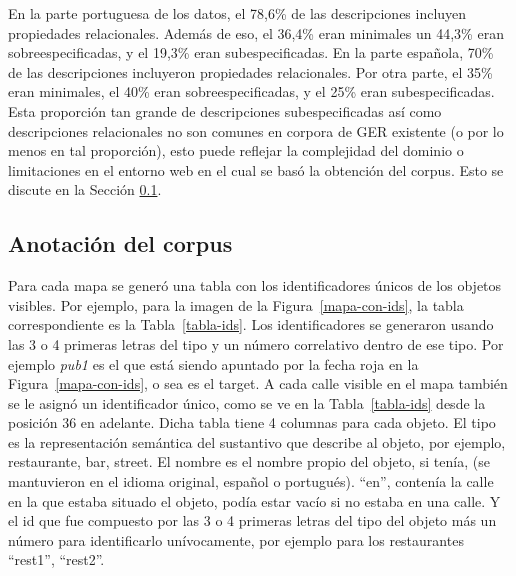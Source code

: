 En la parte portuguesa de los datos, el 78,6\% de las descripciones incluyen propiedades relacionales. Adem\'as de eso, el 36,4\% eran minimales un 44,3\% eran sobreespecificadas, y el 19,3\% eran subespecificadas. En la parte espa\~nola, 70\% de las descripciones incluyeron propiedades relacionales. Por otra parte, el 35\% eran minimales, el 40\% eran sobreespecificadas, y el 25\% eran subespecificadas.
Esta proporci\'on tan grande de descripciones subespecificadas as\'{i} como descripciones relacionales no son comunes en corpora de GER existente (o por lo menos en tal proporci\'on), esto puede reflejar la complejidad del dominio o limitaciones en el entorno web en el cual se bas\'o la obtenci\'on del corpus. Esto se discute en la Secci\'on \ref{corpus-anotacion}.



\subsection{Anotaci\'on del corpus}
\label{corpus-anotacion}

Para cada mapa se gener\'o una tabla con los identificadores \'unicos de los objetos visibles. Por ejemplo, para la imagen de la Figura~\ref{mapa-con-ids}, la tabla correspondiente es la Tabla~\ref{tabla-ids}. Los identificadores se generaron usando las 3 o 4 primeras letras del tipo y un n\'umero correlativo dentro de ese tipo. Por ejemplo {\it pub1} es el que est\'a siendo apuntado por la fecha roja en la Figura~\ref{mapa-con-ids}, o sea es el target. A cada calle visible en el mapa tambi\'en se le asign\'o un identificador \'unico, como se ve en la Tabla~\ref{tabla-ids} desde la posici\'on 36 en adelante. Dicha tabla tiene 4 columnas para cada objeto. El tipo es la representaci\'on sem\'antica del sustantivo que describe al objeto, por ejemplo, restaurante, bar, street. El nombre es el nombre propio del objeto, si ten\'ia, (se mantuvieron en el idioma original, espa\~nol o portugu\'es). ``en'', conten\'ia la calle en la que estaba situado el objeto, pod\'ia estar vac\'io si no estaba en una calle. Y el id que  fue compuesto por las 3 o 4 primeras letras del tipo del objeto m\'as un n\'umero para identificarlo un\'ivocamente, por ejemplo para los restaurantes ``rest1'', ``rest2''.


